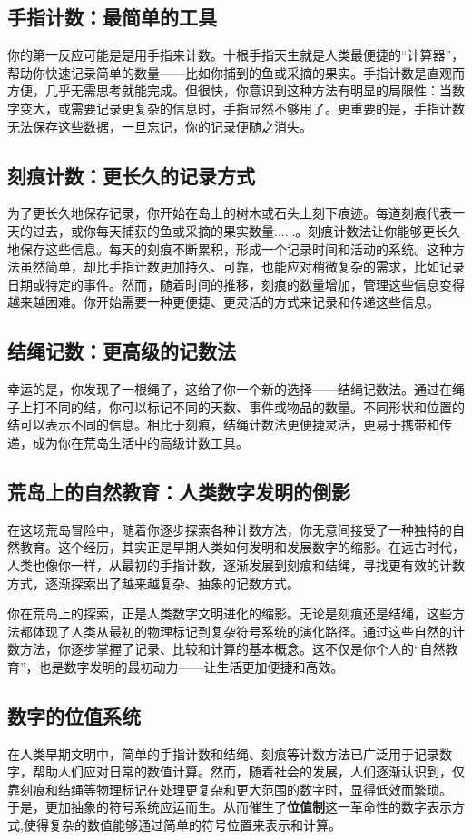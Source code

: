 \subsection*{手指计数：最简单的工具}
你的第一反应可能是是用手指来计数。十根手指天生就是人类最便捷的“计算器”，帮助你快速记录简单的数量——比如你捕到的鱼或采摘的果实。手指计数是直观而方便，几乎无需思考就能完成。但很快，你意识到这种方法有明显的局限性：当数字变大，或需要记录更复杂的信息时，手指显然不够用了。更重要的是，手指计数无法保存这些数据，一旦忘记，你的记录便随之消失。

\subsection*{刻痕计数：更长久的记录方式}
为了更长久地保存记录，你开始在岛上的树木或石头上刻下痕迹。每道刻痕代表一天的过去，或你每天捕获的鱼或采摘的果实数量......。刻痕计数法让你能够更长久地保存这些信息。每天的刻痕不断累积，形成一个记录时间和活动的系统。这种方法虽然简单，却比手指计数更加持久、可靠，也能应对稍微复杂的需求，比如记录日期或特定的事件。然而，随着时间的推移，刻痕的数量增加，管理这些信息变得越来越困难。你开始需要一种更便捷、更灵活的方式来记录和传递这些信息。

\subsection*{结绳记数：更高级的记数法}
幸运的是，你发现了一根绳子，这给了你一个新的选择——结绳记数法。通过在绳子上打不同的结，你可以标记不同的天数、事件或物品的数量。不同形状和位置的结可以表示不同的信息。相比于刻痕，结绳计数法更便捷灵活，更易于携带和传递，成为你在荒岛生活中的高级计数工具。

\subsection*{荒岛上的自然教育：人类数字发明的倒影}
在这场荒岛冒险中，随着你逐步探索各种计数方法，你无意间接受了一种独特的自然教育。这个经历，其实正是早期人类如何发明和发展数字的缩影。在远古时代，人类也像你一样，从最初的手指计数，逐渐发展到刻痕和结绳，寻找更有效的计数方式，逐渐探索出了越来越复杂、抽象的记数方式。

你在荒岛上的探索，正是人类数字文明进化的缩影。无论是刻痕还是结绳，这些方法都体现了人类从最初的物理标记到复杂符号系统的演化路径。通过这些自然的计数方法，你逐步掌握了记录、比较和计算的基本概念。这不仅是你个人的“自然教育”，也是数字发明的最初动力——让生活更加便捷和高效。

\subsection{数字的位值系统}
在人类早期文明中，简单的手指计数和结绳、刻痕等计数方法已广泛用于记录数字，帮助人们应对日常的数值计算。然而，随着社会的发展，人们逐渐认识到，仅靠刻痕和结绳等物理标记在处理更复杂和更大范围的数字时，显得低效而繁琐。 于是，更加抽象的符号系统应运而生。从而催生了{\bf 位值制}这一革命性的数字表示方式,使得复杂的数值能够通过简单的符号位置来表示和计算。

